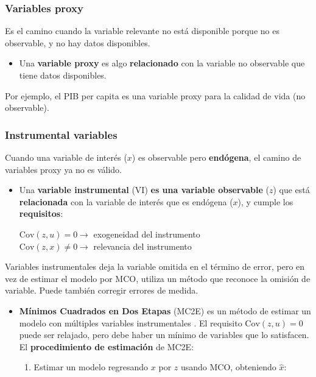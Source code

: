 \documentclass[10pt, a4paper, landscape]{extarticle}
\newcommand{\Cov}{\mathrm{Cov}}
\begin{document}
\begin{multicols}{3}
		\subsubsection*{Variables proxy}
			Es el camino cuando la variable relevante no está disponible porque no es observable, y no hay datos disponibles.
			\begin{itemize}[leftmargin=*]
				\item Una \textbf{variable proxy} es algo \textbf{relacionado} con la variable no observable que tiene datos disponibles.
			\end{itemize}
			Por ejemplo, el PIB per capita es una variable proxy para la calidad de vida (no observable).
		\subsubsection*{Instrumental variables}
			Cuando una variable de interés ($x$) es observable pero \textbf{endógena}, el camino de variables proxy ya no es válido.
			\begin{itemize}[leftmargin=*]
				\item Una \textbf{variable instrumental} (VI) \textbf{es una variable observable} ($z$) que está \textbf{relacionada} con la variable de interés que es endógena ($x$), y cumple los \textbf{requisitos}:
				\begin{center}
					$\Cov(z,u) = 0 \rightarrow$ exogeneidad del instrumento \\
					$\Cov(z,x) \neq 0 \rightarrow$ relevancia del instrumento
				\end{center}
			\end{itemize}
			Variables instrumentales deja la variable omitida en el término de error, pero en vez de estimar el modelo por MCO, utiliza un método que reconoce la omisión de variable. Puede también corregir errores de medida.
			\begin{itemize}[leftmargin=*]
				\item \textbf{Mínimos Cuadrados en Dos Etapas} (MC2E) es un método de estimar un modelo con múltiples variables instrumentales . El requisito $\Cov(z,u) = 0$ puede ser relajado, pero debe haber un mínimo de variables que lo satisfacen. \\
				El \textbf{procedimiento de estimación} de MC2E:
				\begin{enumerate}[leftmargin=*]
					\item Estimar un modelo regresando $x$ por $z$ usando MCO, obteniendo $\hat{x}$:
					\begin{center}

\end{center}
\end{enumerate}
\end{itemize}
\end{multicols}
\end{document}
